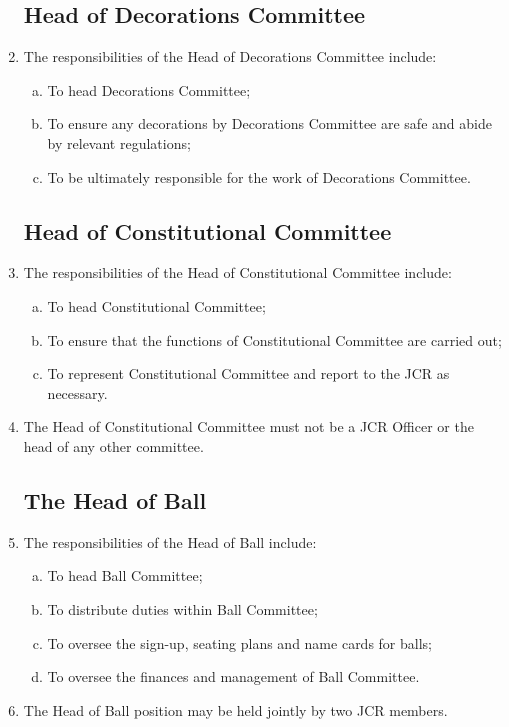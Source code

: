 \documentclass[12pt]{article}  %
\begin{document}
\begin{enumerate}
    \subsection{Head of Decorations Committee}
    \item The responsibilities of the Head of Decorations Committee include:
    \begin{enumerate}[(a)]
        \item To head Decorations Committee;
        \item To ensure any decorations by Decorations Committee are safe and abide by relevant regulations;
        \item To be ultimately responsible for the work of Decorations Committee.
    \end{enumerate}
    \subsection{Head of Constitutional Committee}
    \item The responsibilities of the Head of Constitutional Committee include:
    \begin{enumerate}[(a)]
        \item To head Constitutional Committee;
        \item To ensure that the functions of Constitutional Committee are carried out;
        \item To represent Constitutional Committee and report to the JCR as necessary.
    \end{enumerate}
    \item The Head of Constitutional Committee must not be a JCR Officer or the head of any other committee.
    \subsection{The Head of Ball}
    \item The responsibilities of the Head of Ball include:
    \begin{enumerate}[(a)]
        \item To head Ball Committee;
        \item To distribute duties within Ball Committee;
        \item To oversee the sign-up, seating plans and name cards for balls;
        \item To oversee the finances and management of Ball Committee.
    \end{enumerate}
    \item The Head of Ball position may be held jointly by two JCR members.

\end{enumerate}
\end{document}
